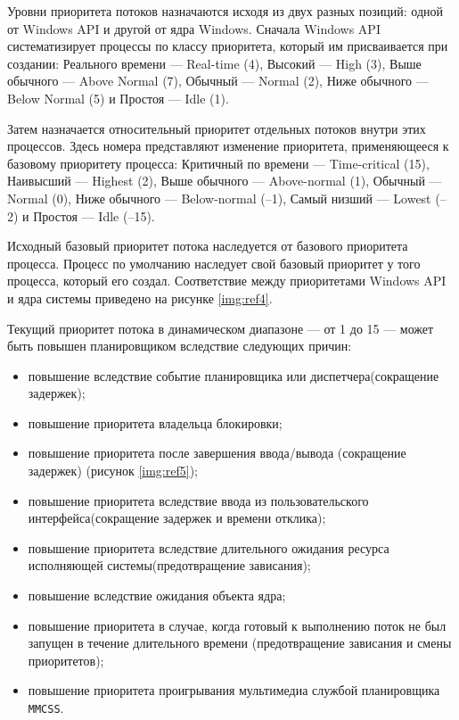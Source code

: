 Уровни приоритета потоков назначаются исходя из двух разных позиций:
одной от Windows API и другой от ядра Windows. 
Сначала Windows API систематизирует процессы по классу приоритета,
который им присваивается при создании: 
Реального времени — Real-time (4), Высокий — High (3),
Выше обычного — Above Normal (7), Обычный — Normal (2), Ниже обычного —
Below Normal (5) и Простоя — Idle (1).

Затем назначается относительный приоритет отдельных потоков внутри этих
процессов. Здесь номера представляют изменение приоритета, применяющееся
к базовому приоритету процесса: 
Критичный по времени — Time-critical (15),
Наивысший — Highest (2), Выше обычного — Above-normal (1), Обычный —
Normal (0), Ниже обычного — Below-normal (–1), Самый низший — Lowest (–2)
и Простоя — Idle (–15).

Исходный базовый приоритет потока наследуется от базового приоритета процесса. Процесс по умолчанию наследует свой базовый приоритет у
того процесса, который его создал.
Соответствие между приоритетами Windows API и ядра системы приведено
на рисунке \ref{img:ref4}.

\begin{figure}[ht!]
\end{figure}

Текущий приоритет потока в динамическом диапазоне --- от 1 до 15 --- может быть повышен планировщиком вследствие следующих причин:

\begin{itemize}
	\item повышение вследствие событие планировщика или диспетчера(сокращение
	      задержек);
	\item повышение приоритета владельца блокировки;
	\item повышение приоритета после завершения ввода/вывода (сокращение задержек) (рисунок \ref{img:ref5});
	\item повышение приоритета вследствие ввода из пользовательского интерфейса(сокращение
	      задержек и времени отклика);
	\item повышение приоритета вследствие длительного ожидания ресурса исполняющей системы(предотвращение зависания);
	\item повышение вследствие ожидания объекта ядра;
	\item повышение приоритета в случае, когда готовый к выполнению поток не был запущен в течение длительного времени (предотвращение зависания и смены приоритетов);
	\item повышение приоритета проигрывания мультимедиа службой планировщика \texttt{MMCSS}.
\end{itemize}

